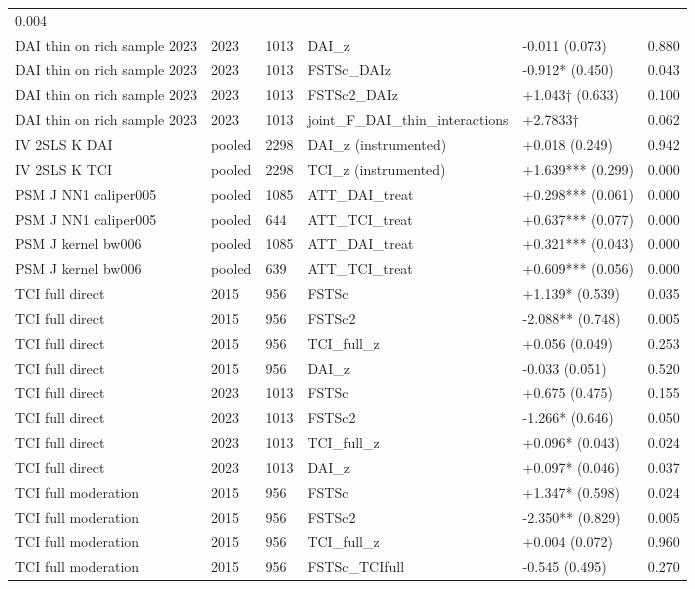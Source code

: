 \documentclass[12pt,a4paper]{article}
\begin{document}
\begin{longtable}[]{@{}llllll@{}}
0.004 \\
DAI thin on rich sample 2023 & 2023 & 1013 & DAI\_z & -0.011 (0.073) &
0.880 \\
DAI thin on rich sample 2023 & 2023 & 1013 & FSTSc\_DAIz & -0.912*
(0.450) & 0.043 \\
DAI thin on rich sample 2023 & 2023 & 1013 & FSTSc2\_DAIz & +1.043†
(0.633) & 0.100 \\
DAI thin on rich sample 2023 & 2023 & 1013 &
joint\_F\_DAI\_thin\_interactions & +2.7833† & 0.062 \\
IV 2SLS K DAI & pooled & 2298 & DAI\_z (instrumented) & +0.018 (0.249) &
0.942 \\
IV 2SLS K TCI & pooled & 2298 & TCI\_z (instrumented) & +1.639***
(0.299) & 0.000 \\
PSM J NN1 caliper005 & pooled & 1085 & ATT\_DAI\_treat & +0.298***
(0.061) & 0.000 \\
PSM J NN1 caliper005 & pooled & 644 & ATT\_TCI\_treat & +0.637***
(0.077) & 0.000 \\
PSM J kernel bw006 & pooled & 1085 & ATT\_DAI\_treat & +0.321*** (0.043)
& 0.000 \\
PSM J kernel bw006 & pooled & 639 & ATT\_TCI\_treat & +0.609*** (0.056)
& 0.000 \\
TCI full direct & 2015 & 956 & FSTSc & +1.139* (0.539) & 0.035 \\
TCI full direct & 2015 & 956 & FSTSc2 & -2.088** (0.748) & 0.005 \\
TCI full direct & 2015 & 956 & TCI\_full\_z & +0.056 (0.049) & 0.253 \\
TCI full direct & 2015 & 956 & DAI\_z & -0.033 (0.051) & 0.520 \\
TCI full direct & 2023 & 1013 & FSTSc & +0.675 (0.475) & 0.155 \\
TCI full direct & 2023 & 1013 & FSTSc2 & -1.266* (0.646) & 0.050 \\
TCI full direct & 2023 & 1013 & TCI\_full\_z & +0.096* (0.043) &
0.024 \\
TCI full direct & 2023 & 1013 & DAI\_z & +0.097* (0.046) & 0.037 \\
TCI full moderation & 2015 & 956 & FSTSc & +1.347* (0.598) & 0.024 \\
TCI full moderation & 2015 & 956 & FSTSc2 & -2.350** (0.829) & 0.005 \\
TCI full moderation & 2015 & 956 & TCI\_full\_z & +0.004 (0.072) &
0.960 \\
TCI full moderation & 2015 & 956 & FSTSc\_TCIfull & -0.545 (0.495) &
0.270 \\

\end{longtable}
\end{document}

